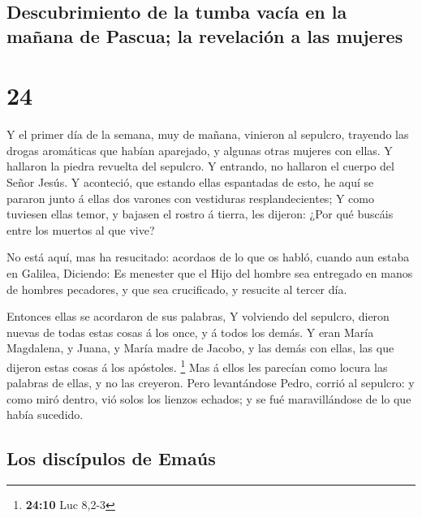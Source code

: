 \hypertarget{descubrimiento-de-la-tumba-vacuxeda-en-la-mauxf1ana-de-pascua-la-revelaciuxf3n-a-las-mujeres}{%
\subsection{Descubrimiento de la tumba vacía en la mañana de Pascua; la
revelación a las
mujeres}\label{descubrimiento-de-la-tumba-vacuxeda-en-la-mauxf1ana-de-pascua-la-revelaciuxf3n-a-las-mujeres}}

\hypertarget{section-23}{%
\section{24}\label{section-23}}

 Y el primer día de la semana, muy de mañana, vinieron al
sepulcro, trayendo las drogas aromáticas que habían aparejado, y algunas
otras mujeres con ellas.  Y hallaron la piedra revuelta
del sepulcro.  Y entrando, no hallaron el cuerpo del Señor
Jesús.  Y aconteció, que estando ellas espantadas de esto,
he aquí se pararon junto á ellas dos varones con vestiduras
resplandecientes;  Y como tuviesen ellas temor, y bajasen
el rostro á tierra, les dijeron: ¿Por qué buscáis entre los muertos al
que vive?

 No está aquí, mas ha resucitado: acordaos de lo que os
habló, cuando aun estaba en Galilea,  Diciendo: Es
menester que el Hijo del hombre sea entregado en manos de hombres
pecadores, y que sea crucificado, y resucite al tercer día.

 Entonces ellas se acordaron de sus palabras,
 Y volviendo del sepulcro, dieron nuevas de todas estas
cosas á los once, y á todos los demás.  Y eran María
Magdalena, y Juana, y María madre de Jacobo, y las demás con ellas, las
que dijeron estas cosas á los apóstoles. \footnote{\textbf{24:10} Luc
  8,2-3}  Mas á ellos les parecían como locura las
palabras de ellas, y no las creyeron.  Pero levantándose
Pedro, corrió al sepulcro: y como miró dentro, vió solos los lienzos
echados; y se fué maravillándose de lo que había sucedido.

\hypertarget{los-discuxedpulos-de-emauxfas}{%
\subsection{Los discípulos de
Emaús}\label{los-discuxedpulos-de-emauxfas}}

